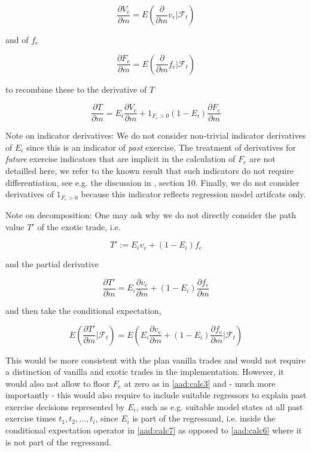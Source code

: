 \begin{equation}\label{aad:calc4}
\frac{\partial V_e}{\partial m} = E \left( \frac{\partial}{\partial m} v_e \bigg| \mathcal{F}_t \right)
\end{equation}

and of $f_e$

\begin{equation}\label{aad:calc5}
\frac{\partial F_e}{\partial m} = E \left( \frac{\partial}{\partial m} f_e \bigg| \mathcal{F}_t \right)
\end{equation}

to recombine these to the derivative of $T$

\begin{equation}\label{aad:calc6}
\frac{\partial T}{\partial m} = E_i \frac{\partial V_e}{\partial m} + 1_{F_e > 0} (1 - E_i) \frac{\partial F_e}{\partial m}
\end{equation}

Note on indicator derivatives: We do not consider non-trivial indicator derivatives of $E_i$ since this is an indicator
of {\em past} exercise. The treatment of derivatives for {\em future} exercise indicators that are implicit in the
calculation of $F_e$ are not detailled here, we refer to the known result that such indicators do not require
differentiation, see e.g. the discussion in \cite{piterbarg_deltas_callable_libor_exotics}, section 10. Finally, we do
not consider derivatives of $1_{F_e > 0}$ because this indicator reflects regression model artifcats only.

Note on decomposition: One may ask why we do not directly consider the path value $T'$ of the exotic trade, i.e.

$$
T' := E_i v_e + (1- E_i) f_e
$$

and the partial derivative

$$
\frac{\partial T'}{\partial m} = E_i \frac{\partial v_e}{\partial m} + (1- E_i) \frac{\partial f_e}{\partial m}
$$

and then take the conditional expectation,

\begin{equation}\label{aad:calc7}
E\left( \frac{\partial T'}{\partial m} \bigg| \mathcal{F}_t \right)  =
E\left( E_i \frac{\partial v_e}{\partial m} + (1- E_i) \frac{\partial f_e}{\partial m} \bigg| \mathcal{F}_t \right)
\end{equation}

This would be more consistent with the plan vanilla trades and would not require a distinction of vanilla and exotic
trades in the implementation. However, it would also not allow to floor $F_e$ at zero as in \ref{aad:calc3} and - much
more importantly - this would also require to include suitable regressors to explain past exercise decisions represented
by $E_i$, such as e.g. suitable model states at all past exercise times $t_1, t_2, \ldots, t_i$, since $E_i$ is part of
the regressand, i.e. inside the conditional expectation operator in \ref{aad:calc7} as opposed to \ref{aad:calc6} where
it is not part of the regressand.

